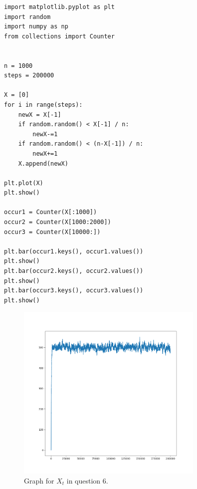 \documentclass[letterpaper, reqno,11pt]{article}
\begin{document}
\begin{lstlisting}
import matplotlib.pyplot as plt
import random
import numpy as np
from collections import Counter


n = 1000
steps = 200000

X = [0]
for i in range(steps):
    newX = X[-1]
    if random.random() < X[-1] / n:
        newX-=1
    if random.random() < (n-X[-1]) / n:
        newX+=1
    X.append(newX)

plt.plot(X)
plt.show()
        
occur1 = Counter(X[:1000])
occur2 = Counter(X[1000:2000])
occur3 = Counter(X[10000:])

plt.bar(occur1.keys(), occur1.values())
plt.show()
plt.bar(occur2.keys(), occur2.values())
plt.show()
plt.bar(occur3.keys(), occur3.values())
plt.show()
\end{lstlisting}

\begin{figure}[htpb]
    \centering
    \includegraphics[width=0.8\textwidth]{q6a}
    \caption{Graph for $X_t$ in question 6.}
    \label{fig:q6a}
\end{figure}
\end{document}
